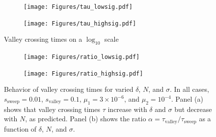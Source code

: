 \documentclass[10pt,twocolumn,twoside]{gsajnl}
\begin{document}
\begin{spacing}{1.5}
\begin{figure}[t]
\begin{subfigure}[b]{0.5\textwidth}
  \texttt{[image: Figures/tau\_lowsig.pdf]}
\end{subfigure}
\begin{subfigure}[b]{0.5\textwidth}
  \texttt{[image: Figures/tau\_highsig.pdf]}
\end{subfigure}
\label{fig:tau}

  \caption{Valley crossing times on a $\log_{10}$ scale}
\begin{subfigure}[b]{0.5\textwidth}
  \texttt{[image: Figures/ratio\_lowsig.pdf]}
\end{subfigure}
\begin{subfigure}[b]{0.5\textwidth}
  \texttt{[image: Figures/ratio\_highsig.pdf]}
\end{subfigure}
\caption{Behavior of valley crossing times for varied $\delta$, $N$, and $\sigma$. In all cases, $s_{\mathrm{sweep}} = 0.01$, $s_{\mathrm{valley}} = 0.1$, $\mu_1 = 3 \times 10^{-6}$, and $\mu_2 = 10^{-4}$. Panel (a) shows that valley crossing times $\tau$ increase with $\delta$ and $\sigma$ but decrease with $N$, as predicted. Panel (b) shows the ratio $\alpha = \tau_{\mathrm{valley}}/\tau_{\mathrm{sweep}}$ as a function of $\delta$, $N$, and $\sigma$.}
\label{fig:tau-ratios}
\end{figure}


\end{spacing}
\end{document}
